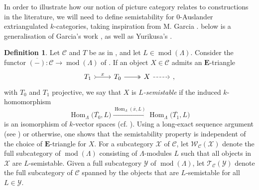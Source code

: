 \documentclass[10pt,twoside, a4paper,reqno]{amsart}
\DeclareMathOperator{\mods}{mod}
\DeclareMathOperator{\Hom}{Hom}
\newcommand{\calC}{\mathcal{C}}
\newcommand{\calT}{\mathcal{T}}
\newcommand{\calW}{\mathcal{W}}
\newcommand{\E}{\mathbf{E}}
\theoremstyle{definition}
\newtheorem{definition}[theorem]{Definition}
\begin{document}
In order to illustrate how our notion of picture category {relates to} constructions in the literature, we will need to define semistability for 0-Auslander extriangulated $k$-categories, taking inspiration from M. Garcia \cite{Gar24}. 
  below is a generalisation of Garcia's work  \cite[{Prop.} 3.14]{Gar23} \cite[Prop. 4.21]{Gar24}, as well as Yurikusa's \cite{Yur}. %



\begin{definition} 
Let $\calC$ and $T$ be as in , and let  $L \in\mods(\Lambda)$. Consider the functor $\overline{(-)} \colon \calC \to \mods(\Lambda)$ of . 
If an object $X\in\calC$ admits an $\E$-triangle
\begin{equation}\label{eq:confX}
        \begin{tikzcd}
            T_1 \arrow[r, tail, "{x}"] & T_0 \arrow[r,two heads] & X \arrow[r, dashed] & {},
        \end{tikzcd}
\end{equation}
with $T_0$ and $T_1$ projective, we say that $X$ is \textit{$L$-semistable} if the induced $k$-homomorphism
\begin{equation*}
    \Hom_{\Lambda}\big(\overline{T_0},L\big) \xrightarrow{{\Hom_\Lambda(\overline{x},L)}} \Hom_{\Lambda}\big(\overline{T_1},L \big)
\end{equation*}
is an isomorphism of $k$-vector spaces (cf. \cite[Def. 3.12]{Gar23}). Using a long-exact sequence argument (see ) or otherwise, one shows that the semistability property is independent of the choice of $\E$-triangle for $X$. 
For a subcategory $\mathcal{X}$ of $\calC$, let $\calW_{\calC}(\mathcal{X})$ denote the full subcategory of $\mods(\Lambda)$ {consisting of} $\Lambda$-modules $L$ such that all objects in $\mathcal{X}$ are $L$-semistable. Given a full subcategory $\mathcal{Y}$ of $\mods(\Lambda)$, let $\calT_{\calC}(\mathcal{Y})$ denote the full subcategory of $\calC$ spanned by the objects that are $L$-semistable for all $L\in\mathcal{Y}$.
\end{definition}
\end{document}
